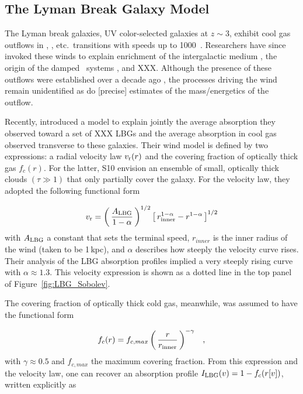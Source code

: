 \documentclass[12pt,preprint]{aastex}
\begin{document}
\subsection{The Lyman Break Galaxy Model}
\label{sec:lbg}

The Lyman break galaxies, UV color-selected galaxies at $z \sim 3$,
exhibit cool gas outflows in , ,
etc.\ transitions with speeds up to 1000\kms\
\citep[e.g.][]{lowenthal,pettini,steidel+10}.
Researchers have since invoked these winds to explain enrichment of
the intergalactic medium \citep[e.g.][]{aguirre,evan}, the origin of the
damped \lya\ systems \citep{nelson,joop98}, and XXX.  Although the
presence of these outflows were established over a decade ago
\citep{lowenthal,pettini98}, the processes driving the wind remain
unidentified as do [precise] estimates of the mass/energetics of the
outflow.

Recently, \cite[][; hereafter S10]{steidel+10} introduced a model to
explain jointly the average absorption they observed
toward a set of XXX LBGs and the average absorption in cool gas
observed transverse to these galaxies.  
Their wind model is defined by two
expressions: a radial velocity law $v_{\rm r}(r)$ and the covering fraction of
optically thick gas $f_c(r)$.  For the latter, S10 envision an
ensemble of small, optically thick clouds $(\tau \gg 1)$ that only
partially cover the galaxy.
For the velocity law, they adopted the following functional
form

\begin{equation}
v_{\rm r} = \left ( \, \frac{A_{\rm LBG}}{1-\alpha} \, \right )^{1/2} \left [ \, r_{\rm
  inner}^{1-\alpha} - r^{1-\alpha} \, \right ]^{1/2}
\label{eqn:LBG_vlaw}
\end{equation}
with $A_{\rm LBG}$ a constant that sets the terminal speed,
$r_{inner}$ is the inner radius of the wind (taken to be 1\,kpc), and
$\alpha$ describes how steeply the velocity curve rises.  Their
analysis of the LBG absorption profiles implied
a very steeply rising curve with $\alpha \approx 1.3$.
This velocity expression is shown as a dotted line in the top panel of
Figure~\ref{fig:LBG_Sobolev}.  

The covering fraction of optically thick cold gas, meanwhile, was assumed to have
the functional form

\begin{equation}
f_c(r) = f_{c,max} \left ( \, \frac{r}{r_{\rm inner}} \, \right )^{-\gamma} \;\;\; ,
\label{eqn:covering}
\end{equation}
with $\gamma \approx 0.5$ and $f_{c,max}$ the maximum covering
fraction.  From this expression and the velocity law, one can recover
an absorption profile $I_{\rm LBG}(v) = 1 - f_c(r[v])$, written
explicitly as
\end{document}
